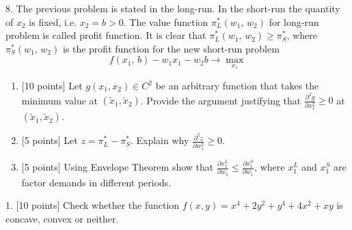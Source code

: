 \documentclass[12pt,a4paper]{article}
\begin{document}
\newpage
{}

8. The previous problem is stated in the long-run. In the short-run the quantity of ${x_2}$ is fixed, i.e. ${x_2} = b > 0$. The value function $\pi _L^*({w_1},\,{w_2})$ for long-run problem is called profit function. It is clear that $\pi_L^*({w_1},\,{w_2}) \geqslant \pi _S^*$, where $\pi_S^*({w_1},\,{w_2})$  is the profit function for the new short-run problem
\[
f({x_1},\,b) - {w_1}{x_1} - {w_2}b \to \max_{x_1}
\]
\begin{enumerate}
  \item {[10 points]} Let $g({x_1}, {x_2}) \in {C^2}$ be an arbitrary function that takes the minimum value at $({\tilde x_1}, {\tilde x_2})$. Provide the argument justifying that $\frac{{{\partial ^2}g}}{{\partial x_1^2}} \geqslant 0$ at $({\tilde x_1}, {\tilde x_2})$.
  \item {[5 points]} Let $z = \pi _L^* - \pi _S^*$. Explain why $\frac{{{\partial ^2}z}}{{\partial w_1^2}} \geqslant 0$.
  \item {[5 points]} Using Envelope Theorem show that $\frac{{\partial x_1^L}}{{\partial {w_1}}} \leqslant \frac{{\partial x_1^S}}{{\partial {w_1}}}$, where $x_1^L$ and $x_1^S$ are factor demands in different periods.
\end{enumerate}





\newpage
{}
\setcounter{page}{1}

1. {[10 points]} Check whether the function $f(x,y)= x^4 + 2y^2+y^4+4x^2+xy$ is concave, convex or neither.

\newpage
{}
\end{document}
